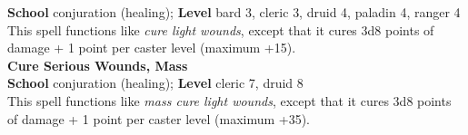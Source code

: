 \textbf{School} conjuration (healing); \textbf{Level} bard 3, cleric 3, druid 4, paladin 4, ranger 4\\
This spell functions like \textit{cure light wounds}, except that it cures 3d8 points of damage + 1 point per caster level (maximum +15).\\
\textbf{Cure Serious Wounds, Mass}\\
\textbf{School} conjuration (healing); \textbf{Level} cleric 7, druid 8\\
This spell functions like \textit{mass cure light wounds}, except that it cures 3d8 points of damage + 1 point per caster level (maximum +35).\\
